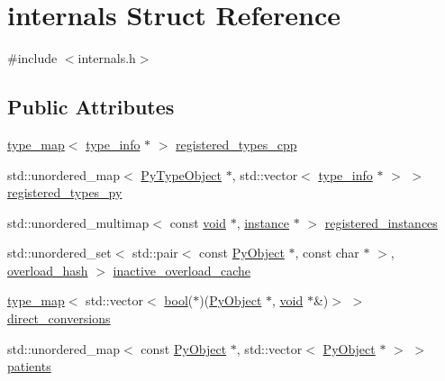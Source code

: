 \hypertarget{structinternals}{}\section{internals Struct Reference}
\label{structinternals}


{\ttfamily \#include $<$internals.\+h$>$}

\subsection*{Public Attributes}
\begin{DoxyCompactItemize}
\item 
\mbox{\hyperlink{internals_8h_a1452521ed22e2af29a7f00dfd4bacb0b}{type\+\_\+map}}$<$ \mbox{\hyperlink{structtype__info}{type\+\_\+info}} $\ast$ $>$ \mbox{\hyperlink{structinternals_a55c8874ee4ee135c2ed8b3f5a958e6a3}{registered\+\_\+types\+\_\+cpp}}
\item 
std\+::unordered\+\_\+map$<$ \mbox{\hyperlink{_python27_2object_8h_a42a55dd6e973872c7a6bc61632070f6f}{Py\+Type\+Object}} $\ast$, std\+::vector$<$ \mbox{\hyperlink{structtype__info}{type\+\_\+info}} $\ast$ $>$ $>$ \mbox{\hyperlink{structinternals_a6148bb4956e17d8a61f410cac7227d04}{registered\+\_\+types\+\_\+py}}
\item 
std\+::unordered\+\_\+multimap$<$ const \mbox{\hyperlink{_s_d_l__opengles2__gl2ext_8h_ae5d8fa23ad07c48bb609509eae494c95}{void}} $\ast$, \mbox{\hyperlink{structinstance}{instance}} $\ast$ $>$ \mbox{\hyperlink{structinternals_af0f521098c149429cd68e058fae16e06}{registered\+\_\+instances}}
\item 
std\+::unordered\+\_\+set$<$ std\+::pair$<$ const \mbox{\hyperlink{_python27_2object_8h_aadc84ac7aed2cfa6f20c25f62bf3dac7}{Py\+Object}} $\ast$, const char $\ast$ $>$, \mbox{\hyperlink{structoverload__hash}{overload\+\_\+hash}} $>$ \mbox{\hyperlink{structinternals_a46a3096ec216e6229e944bbc6cff7b3d}{inactive\+\_\+overload\+\_\+cache}}
\item 
\mbox{\hyperlink{internals_8h_a1452521ed22e2af29a7f00dfd4bacb0b}{type\+\_\+map}}$<$ std\+::vector$<$ \mbox{\hyperlink{asdl_8h_af6a258d8f3ee5206d682d799316314b1}{bool}}($\ast$)(\mbox{\hyperlink{_python27_2object_8h_aadc84ac7aed2cfa6f20c25f62bf3dac7}{Py\+Object}} $\ast$, \mbox{\hyperlink{_s_d_l__opengles2__gl2ext_8h_ae5d8fa23ad07c48bb609509eae494c95}{void}} $\ast$\&)$>$ $>$ \mbox{\hyperlink{structinternals_acec753819721884fcd4a650dcdfa40d2}{direct\+\_\+conversions}}
\item 
std\+::unordered\+\_\+map$<$ const \mbox{\hyperlink{_python27_2object_8h_aadc84ac7aed2cfa6f20c25f62bf3dac7}{Py\+Object}} $\ast$, std\+::vector$<$ \mbox{\hyperlink{_python27_2object_8h_aadc84ac7aed2cfa6f20c25f62bf3dac7}{Py\+Object}} $\ast$ $>$ $>$ \mbox{\hyperlink{structinternals_a10f84966ff086d44cd078d139b3646d9}{patients}}

\end{DoxyCompactItemize}
